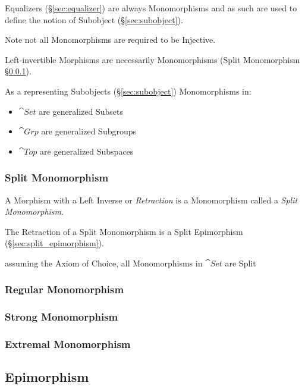Equalizers (\S\ref{sec:equalizer}) are always Monomorphisms and as
such are used to define the notion of Subobject
(\S\ref{sec:subobject}).

\fist Note not all Monomorphisms are required to be Injective.

Left-invertible Morphisms are necessarily Monomorphisms (Split
Monomorphism \S\ref{sec:split_monomorphism}).

As a representing Subobjects (\S\ref{sec:subobject}) Monomorphisms in:
\begin{itemize}
  \item $\cat{Set}$ are generalized Subsets
  \item $\cat{Grp}$ are generalized Subgroups
  \item $\cat{Top}$ are generalized Subspaces
\end{itemize}



\subsubsection{Split Monomorphism}\label{sec:split_monomorphism}

A Morphism with a Left Inverse or \emph{Retraction} is a Monomorphism
called a \emph{Split Monomorphism}.

The Retraction of a Split Monomorphism is a Split Epimorphism
(\S\ref{sec:split_epimorphism}).

assuming the Axiom of Choice, all Monomorphisms in $\cat{Set}$ are
Split



\subsubsection{Regular Monomorphism}\label{sec:regular_monomorphism}

\subsubsection{Strong Monomorphism}\label{sec:strong_monomorphism}

\subsubsection{Extremal Monomorphism}\label{sec:extremal_monomorphism}



\subsection{Epimorphism}\label{sec:epimorphism}

